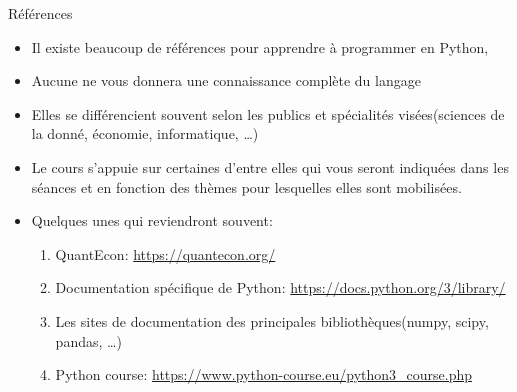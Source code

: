\documentclass[notes, ignorenonframetext, compress, 10pt, xcolor=svgnames, aspectratio=169]{beamer}
\begin{document}
\begin{frame}[allowframebreaks]{Références}
    \begin{itemize}
        \item Il existe beaucoup de références pour apprendre à programmer en Python,
        \item Aucune ne vous donnera une connaissance complète du langage
        \item Elles se différencient souvent selon les publics et spécialités
         visées(sciences de la donné, économie, informatique, \ldots)
        \item Le cours s'appuie sur certaines d'entre elles qui vous seront indiquées dans les séances 
        et en fonction des thèmes pour lesquelles elles sont mobilisées. 
        \framebreak
        \item Quelques unes qui reviendront souvent:
        \begin{enumerate}
            \item QuantEcon: \url{https://quantecon.org/}
            \item Documentation spécifique de Python: \url{https://docs.python.org/3/library/}
            \item Les sites de documentation des principales bibliothèques(numpy, scipy, pandas, \ldots)
            \item Python course: \url{https://www.python-course.eu/python3_course.php}
        \end{enumerate}
    \end{itemize}
\end{frame}
%
%

\end{document}
